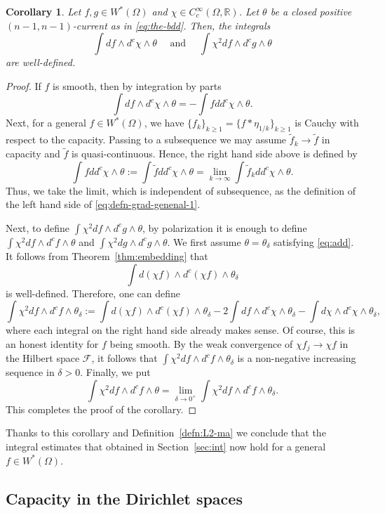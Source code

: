 \documentclass{amsart}
\newcommand{\wt}[1]{\widetilde{#1}}
\newcommand{\de}{\delta}
\newcommand{\te}{\theta}
\newcommand{\Om}{\Omega}
\newcommand{\cF}{\mathcal{F}}
\newcommand{\bR}{\mathbb{R}}
\newtheorem{cor}[thm]{Corollary}
\theoremstyle{definition}
\numberwithin{thm}{section}
\numberwithin{equation}{section}
\renewcommand{\[}{\begin{equation}}
\renewcommand{\]}{\end{equation}}
\newcommand{\wed}{\wedge}
\begin{document}
\begin{cor} Let $f, g \in W^*(\Om)$ and $\chi \in C^\infty_c(\Om, \bR)$. Let $\te$ be a closed positive $(n-1,n-1)$-current as in \eqref{eq:the-bdd}. Then, the integrals
$$
	\int df \wed d^c \chi \wed \te \quad
\text{ and } \quad 
	\int \chi^2 df \wed d^c g \wed \te
$$
are well-defined.
\end{cor}

\begin{proof} If $f$ is smooth, then by integration by parts 
\[\label{eq:defn-grad-genenal-1}
	\int df \wed d^c\chi \wed \te = - \int f dd^c \chi \wed \te. 
\]
Next, for a general $f\in W^*(\Om)$, we have $\{f_k\}_{k\geq 1} = \{f* \eta_{1/k}\}_{k\geq 1}$ is Cauchy with respect to the capacity. Passing to a subsequence we may assume  $\wt f_k \to \wt f$ in capacity and  $\wt f$ is quasi-continuous. Hence,  the right hand side above is defined by 
$$
	\int f dd^c \chi \wed \te := \int \wt f dd^c \chi \wed \te = \lim_{k\to \infty} \int \wt f_k dd^c \chi \wed \te.
$$
Thus, we take the limit, which is independent of subsequence, as the definition of the left hand side of \eqref{eq:defn-grad-genenal-1}.

Next, to define $\int \chi^2 df \wed d^c g \wed \te$, by polarization it is enough to define $\int \chi^2 df \wed d^c f\wed\te$ and $\int \chi^2 dg \wed d^c g\wed\te$. We first assume $\te = \te_\de$ satisfying \eqref{eq:add}. It follows from Theorem~\ref{thm:embedding} that 
$$
	\int d(\chi f) \wed d^c(\chi f) \wed \te_\de
$$
is well-defined. Therefore, one can define
$$
	\int \chi^2 df \wed d^c f \wed \te_\de := \int d(\chi f) \wed d^c(\chi f) \wed \te_\de - 2 \int df \wed d^c \chi \wed \te_\de - \int d\chi \wed d^c \chi \wed\te_\de,
$$
where each integral on the right hand side already makes sense. Of course,
this is an honest identity for $f$ being  smooth. By the weak convergence of $\chi f_j \to \chi f$ in the Hilbert space $\cF$,  it follows that 
$
	\int \chi^2 df \wed d^c f\wed \te_\de
$
is a non-negative  increasing sequence in $\de>0$. Finally, we put
$$\int \chi^2 df \wed d^c f\wed \te = \lim_{\de\to 0^+} \int \chi^2 df \wed d^c f\wed \te_\de.
$$
This completes the proof of the corollary.
\end{proof}

Thanks to this corollary and Definition~\ref{defn:L2-ma} we conclude that the integral estimates that obtained in Section~\ref{sec:int} now hold for a general $f\in W^*(\Om)$.

\subsection{Capacity in the Dirichlet spaces}
\label{ss:dirichlet-cap}
\end{document}
